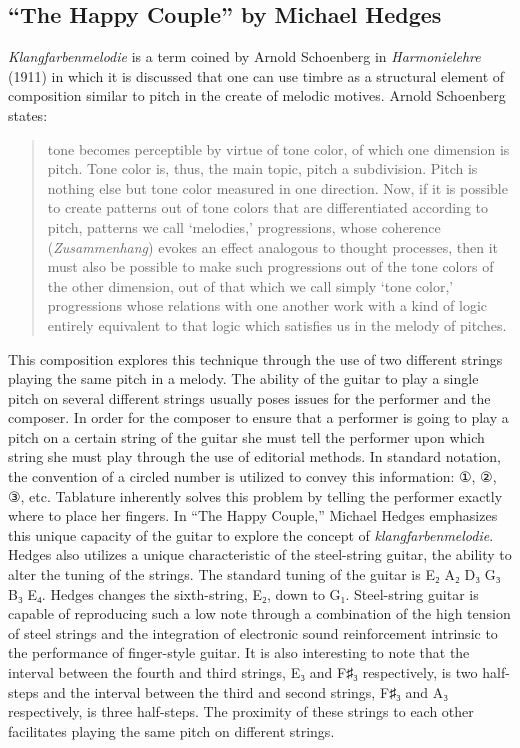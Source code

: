 \documentclass{tufte-handout}
\begin{document}
\subsection*{``The Happy Couple'' by Michael Hedges}
\emph{Klangfarbenmelodie} is a term coined by Arnold Schoenberg in \emph{Harmonielehre} (1911) in which it is discussed that one can use timbre as a structural element of composition similar to pitch in the create of melodic motives. Arnold Schoenberg states:
\begin{quote}
  tone becomes perceptible by virtue of tone color, of which one dimension is pitch. Tone color is, thus, the main topic, pitch a subdivision. Pitch is nothing else but tone color measured in one direction. Now, if it is possible to create patterns out of tone colors that are differentiated according to pitch, patterns we call `melodies,' progressions, whose coherence (\emph{Zusammenhang}) evokes an effect analogous to thought processes, then it must also be possible to make such progressions out of the tone colors of the other dimension, out of that which we call simply `tone color,' progressions whose relations with one another work with a kind of logic entirely equivalent to that logic which satisfies us in the melody of pitches.
\end{quote}
This composition explores this technique through the use of two different
strings playing the same pitch in a melody. The ability of the guitar to play
a single pitch on several different strings usually poses issues for the
performer and the composer. In order for the composer to ensure that a
performer is going to play a pitch on a certain string of the guitar she must
tell the performer upon which string she must play through the use of
editorial methods. In standard notation, the convention of a circled number is
utilized to convey this information: ①, ②, ③, etc. Tablature inherently solves
this problem by telling the performer exactly where to place her fingers. In
``The Happy Couple,'' Michael Hedges emphasizes this unique capacity of the
guitar to explore the concept of \emph{klangfarbenmelodie}. Hedges also
utilizes a unique characteristic of the steel-string guitar, the ability to
alter the tuning of the strings. The standard tuning of the guitar is E₂ A₂ D₃
G₃ B₃ E₄. Hedges changes the sixth-string, E₂, down to G₁. Steel-string guitar
is capable of reproducing such a low note through a combination of the high
tension of steel strings and the integration of electronic sound reinforcement
intrinsic to the performance of finger-style guitar. It is also interesting to
note that the interval between the fourth and third strings, E₃ and F♯₃
respectively, is two half-steps and the interval between the third and second
strings, F♯₃ and A₃ respectively, is three half-steps. The proximity of these
strings to each other facilitates playing the same pitch on different strings.
\end{document}
